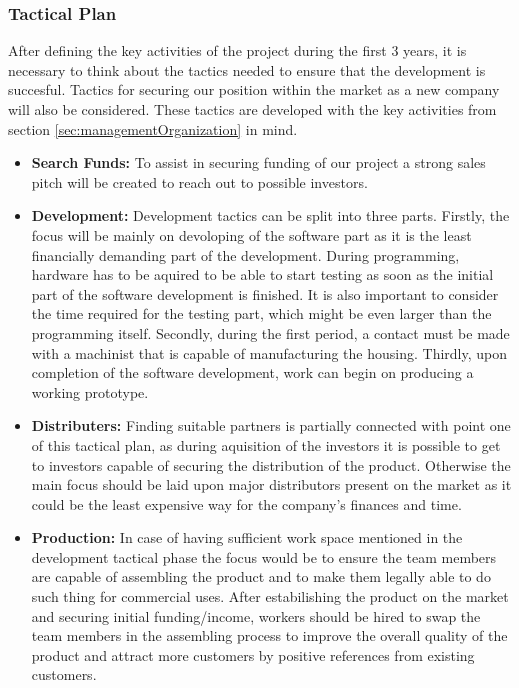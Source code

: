 \subsubsection{Tactical Plan}
After defining the key activities of the project during the first 3 years, it is necessary to think about the tactics needed to ensure that the development is succesful.
 Tactics for securing our position within the market as a new company will also be considered.
These tactics are developed with the key activities from section \ref{sec:managementOrganization} in mind.

\begin{itemize}
	\item \textbf{Search Funds:} To assist in securing funding of our project a strong sales pitch will be created to reach out to possible investors.
\item \textbf{Development:} Development tactics can be split into three parts. 
Firstly, the focus will be mainly on devoloping of the software part as it is the least financially demanding part of the development. 
During programming, hardware has to be aquired to be able to start testing as soon as the initial part of the software development is finished. 
It is also important to consider the time required for the testing part, which might be even larger than the programming itself. 
Secondly, during the first period, a contact must be made with a machinist that is capable of manufacturing the housing.
Thirdly, upon completion of the software development, work can begin on producing a working prototype.
\item \textbf{Distributers:} Finding suitable partners is partially connected with point one of this tactical plan, as during aquisition of the investors it is possible to get to investors capable of securing the distribution of the product. Otherwise the main focus should be laid upon major distributors present on the market as it could be the least expensive way for the company's finances and time.
\item \textbf{Production:} In case of having sufficient work space mentioned in the development tactical phase the focus would be to ensure the team members are capable of assembling the product and to make them legally able to do such thing for commercial uses. After estabilishing the product on the market and securing initial funding/income, workers should be hired to swap the team members in the assembling process to improve the overall quality of the product and attract more customers by positive references from existing customers.

\end{itemize}
